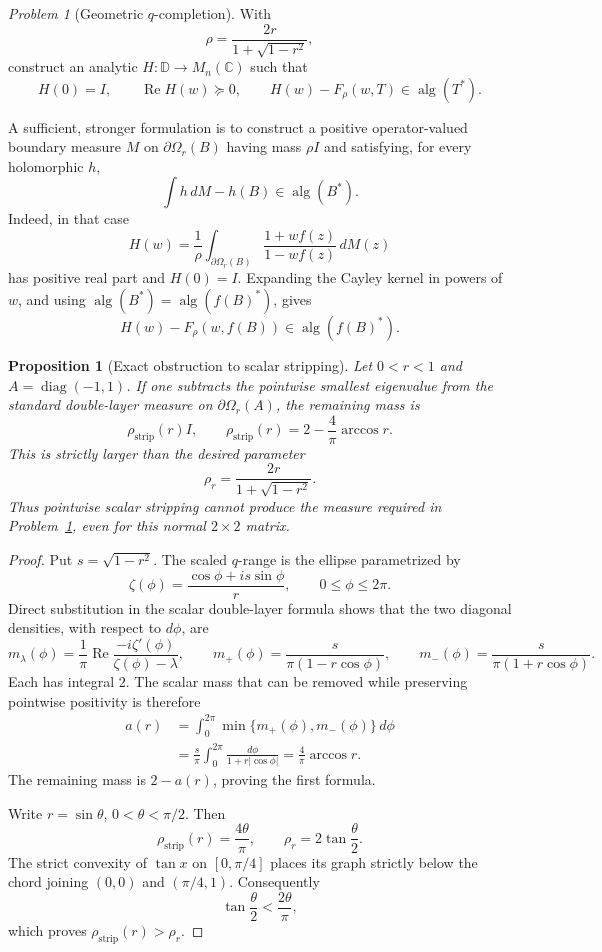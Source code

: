 \documentclass[11pt]{article}
\newtheorem{proposition}[theorem]{Proposition}
\theoremstyle{remark}
\newtheorem{problem}[theorem]{Problem}
\newcommand{\C}{\mathbb C}
\newcommand{\D}{\mathbb D}
\newcommand{\alg}{\operatorname{alg}}
\newcommand{\RePart}{\operatorname{Re}}
\newcommand{\diag}{\operatorname{diag}}
\begin{document}
\begin{problem}[Geometric \(q\)-completion]
\label{prob:geometric-completion}
With
\[
 \rho=\frac{2r}{1+\sqrt{1-r^2}},
\]
construct an analytic \(H:\D\to M_n(\C)\) such that
\[
 H(0)=I,\qquad \RePart H(w)\succeq0,\qquad
 H(w)-F_\rho(w,T)\in\alg(T^*).
\]
\end{problem}

A sufficient, stronger formulation is to construct a positive operator-valued
boundary measure \(M\) on \(\partial\Omega_r(B)\) having mass
\(\rho I\) and satisfying, for every holomorphic \(h\),
\[
 \int h\,dM-h(B)\in\alg(B^*).
\]
Indeed, in that case
\[
 H(w)=\frac1\rho
 \int_{\partial\Omega_r(B)}
 \frac{1+w f(z)}{1-w f(z)}\,dM(z)
\]
has positive real part and \(H(0)=I\).  Expanding the Cayley kernel
in powers of \(w\), and using
\(\alg(B^*)=\alg(f(B)^*)\), gives
\[
 H(w)-F_\rho(w,f(B))\in\alg(f(B)^*).
\]

\begin{proposition}[Exact obstruction to scalar stripping]
\label{prop:scalar-stripping}
Let \(0<r<1\) and \(A=\diag(-1,1)\).  If one subtracts the pointwise
smallest eigenvalue from the standard double-layer measure on
\(\partial\Omega_r(A)\), the remaining mass is
\[
 \rho_{\mathrm{strip}}(r)I,\qquad
 \rho_{\mathrm{strip}}(r)
 =2-\frac4\pi\arccos r.
\]
This is strictly larger than the desired parameter
\[
 \rho_r=\frac{2r}{1+\sqrt{1-r^2}}.
\]
Thus pointwise scalar stripping cannot produce the measure required
in Problem~\ref{prob:geometric-completion}, even for this normal
\(2\times2\) matrix.
\end{proposition}

\begin{proof}
Put \(s=\sqrt{1-r^2}\).  The scaled \(q\)-range is the ellipse
parametrized by
\[
 \zeta(\phi)=\frac{\cos\phi+is\sin\phi}{r},
 \qquad 0\leq\phi\leq2\pi.
\]
Direct substitution in the scalar double-layer formula shows that
the two diagonal densities, with respect to \(d\phi\), are
\[
 m_\lambda(\phi)
 =\frac1\pi\RePart\frac{-i\zeta'(\phi)}
 {\zeta(\phi)-\lambda},
 \qquad
 m_+(\phi)=\frac{s}{\pi(1-r\cos\phi)},
 \qquad
 m_-(\phi)=\frac{s}{\pi(1+r\cos\phi)}.
\]
Each has integral \(2\).  The scalar mass that can be removed while
preserving pointwise positivity is therefore
\begin{align*}
 a(r)
 &=\int_0^{2\pi}\min\{m_+(\phi),m_-(\phi)\}\,d\phi\\
 &=\frac{s}{\pi}\int_0^{2\pi}
   \frac{d\phi}{1+r|\cos\phi|}
 =\frac4\pi\arccos r.
\end{align*}
The remaining mass is \(2-a(r)\), proving the first formula.

Write \(r=\sin\theta\), \(0<\theta<\pi/2\).  Then
\[
 \rho_{\mathrm{strip}}(r)=\frac{4\theta}{\pi},
 \qquad
 \rho_r=2\tan\frac{\theta}{2}.
\]
The strict convexity of \(\tan x\) on \([0,\pi/4]\) places its graph
strictly below the chord joining \((0,0)\) and \((\pi/4,1)\).
Consequently
\[
 \tan\frac{\theta}{2}<\frac{2\theta}{\pi},
\]
which proves \(\rho_{\mathrm{strip}}(r)>\rho_r\).
\end{proof}
\end{document}
